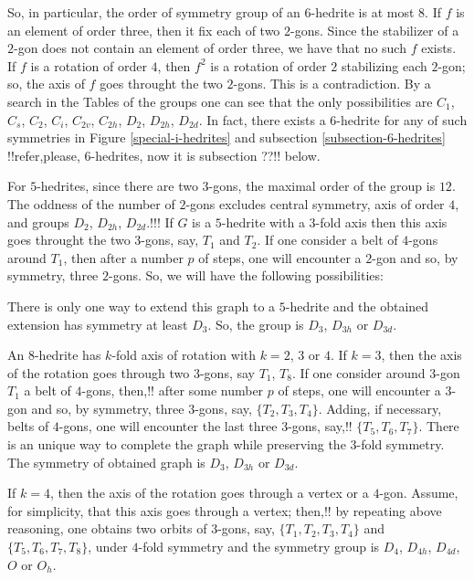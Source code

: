 \documentclass[12pt]{article}
\begin{document}
So, in particular, the order of symmetry group of an $6$-hedrite is at
most $8$. If $f$ is an element of order three, then it fix each of two
$2$-gons. Since the stabilizer of a $2$-gon does not contain an element
of order three, we have that no such $f$ exists. If $f$ is a rotation of
order $4$, then $f^2$ is a rotation of order $2$ stabilizing each $2$-gon;
so, the axis of $f$ goes throught the two $2$-gons. This is a contradiction.
By a search in the Tables of the groups one can see that the only possibilities are $C_1$, $C_s$, $C_2$, $C_i$, $C_{2v}$, $C_{2h}$, $D_2$, $D_{2h}$, $D_{2d}$. In fact, there exists a $6$-hedrite for any of such symmetries in Figure \ref{special-i-hedrites} and subsection \ref{subsection-6-hedrites}
!!refer,please, 6-hedrites, now it is subsection ??!!
 below.

For $5$-hedrites, since there are two $3$-gons, the maximal order of the group is $12$. The oddness of the number of $2$-gons excludes central symmetry, axis of order $4$, and groups $D_2$, $D_{2h}$, $D_{2d}$.!!!
If $G$ is a $5$-hedrite with a $3$-fold axis then this axis goes throught
the two $3$-gons, say, $T_1$ and $T_2$. If one consider a belt of $4$-gons
around $T_1$, then after a number $p$ of steps, one will encounter a
$2$-gon and so, by symmetry, three $2$-gons. So, we will have the 
following possibilities:

\begin{center}
\epsfxsize=60mm
\end{center}

There is only one way to extend this graph to a $5$-hedrite and the obtained extension has symmetry at least $D_3$. So, the group is $D_{3}$, $D_{3h}$ or $D_{3d}$.

An $8$-hedrite has $k$-fold axis of rotation with $k=2$, $3$ or $4$. 
If $k=3$, then the axis of the rotation goes through two $3$-gons,
say $T_1$, $T_8$. If one consider around $3$-gon $T_1$ a belt of 
$4$-gons, then,!! after some number $p$ of steps, one will encounter a 
$3$-gon and so, by symmetry, three $3$-gons, say, $\{T_2, T_3, T_4\}$.
Adding, if necessary, belts of $4$-gons, one will encounter the last 
three $3$-gons, say,!! $\{T_5, T_6, T_7\}$. There is an unique way to 
complete the graph while preserving the $3$-fold symmetry. The 
symmetry of obtained graph is $D_3$, $D_{3h}$ or $D_{3d}$.

If $k=4$, then the axis of the rotation goes through a vertex or
a $4$-gon. Assume, for simplicity, that this axis goes through a
vertex; then,!! by repeating above reasoning, one obtains two orbits of
$3$-gons, say, $\{T_1, T_2, T_3, T_4\}$ and $\{T_5, T_6, T_7, T_8\}$,
under $4$-fold symmetry and the symmetry group is $D_4$, $D_{4h}$,
$D_{4d}$, $O$ or $O_h$.
\end{document}
